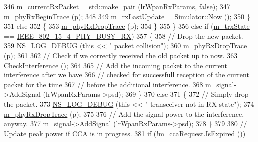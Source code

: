 \begin{DoxyCode}
346           \hyperlink{classns3_1_1LrWpanPhy_a5e25bc6b183652edc17015d04cca92a3}{m\_currentRxPacket} = std::make\_pair (lrWpanRxParams, \textcolor{keyword}{false});
347           \hyperlink{classns3_1_1LrWpanPhy_acd238a82f3646333c30a9100fecafbda}{m\_phyRxBeginTrace} (p);
348 
349           \hyperlink{classns3_1_1LrWpanPhy_ada4772165b76d85314ecbc3c19a404ab}{m\_rxLastUpdate} = \hyperlink{classns3_1_1Simulator_ac3178fa975b419f7875e7105be122800}{Simulator::Now} ();
350         \}
351       \textcolor{keywordflow}{else}
352         \{
353           \hyperlink{classns3_1_1LrWpanPhy_aa649b07e1ef1151e1758c5091e6a7a00}{m\_phyRxDropTrace} (p);
354         \}
355     \}
356   \textcolor{keywordflow}{else} \textcolor{keywordflow}{if} (\hyperlink{classns3_1_1LrWpanPhy_a316704a4eb96e04f4b960ba3577fe0ce}{m\_trxState} == \hyperlink{group__lr-wpan_gga6494269d13d45c511a07b7ccbb1de754a09f430974fda07ac7d4d483a1ce23b98}{IEEE\_802\_15\_4\_PHY\_BUSY\_RX})
357     \{
358       \textcolor{comment}{// Drop the new packet.}
359       \hyperlink{group__logging_ga413f1886406d49f59a6a0a89b77b4d0a}{NS\_LOG\_DEBUG} (\textcolor{keyword}{this} << \textcolor{stringliteral}{" packet collision"});
360       \hyperlink{classns3_1_1LrWpanPhy_aa649b07e1ef1151e1758c5091e6a7a00}{m\_phyRxDropTrace} (p);
361 
362       \textcolor{comment}{// Check if we correctly received the old packet up to now.}
363       \hyperlink{classns3_1_1LrWpanPhy_a8a339fadde6f27b6a495377a4eca7943}{CheckInterference} ();
364 
365       \textcolor{comment}{// Add the incoming packet to the current interference after we have}
366       \textcolor{comment}{// checked for successfull reception of the current packet for the time}
367       \textcolor{comment}{// before the additional interference.}
368       \hyperlink{classns3_1_1LrWpanPhy_a923130b0bacef678012bcc8fdc68fd10}{m\_signal}->AddSignal (lrWpanRxParams->psd);
369     \}
370   \textcolor{keywordflow}{else}
371     \{
372       \textcolor{comment}{// Simply drop the packet.}
373       \hyperlink{group__logging_ga413f1886406d49f59a6a0a89b77b4d0a}{NS\_LOG\_DEBUG} (\textcolor{keyword}{this} << \textcolor{stringliteral}{" transceiver not in RX state"});
374       \hyperlink{classns3_1_1LrWpanPhy_aa649b07e1ef1151e1758c5091e6a7a00}{m\_phyRxDropTrace} (p);
375 
376       \textcolor{comment}{// Add the signal power to the interference, anyway.}
377       \hyperlink{classns3_1_1LrWpanPhy_a923130b0bacef678012bcc8fdc68fd10}{m\_signal}->AddSignal (lrWpanRxParams->psd);
378     \}
379 
380   \textcolor{comment}{// Update peak power if CCA is in progress.}
381   \textcolor{keywordflow}{if} (!\hyperlink{classns3_1_1LrWpanPhy_a5fc2fce788ea008a00078c62682c02d0}{m\_ccaRequest}.\hyperlink{classns3_1_1EventId_a5c30c92e7c1c34b4e8505cc07ed71b02}{IsExpired} ())

\end{DoxyCode}
